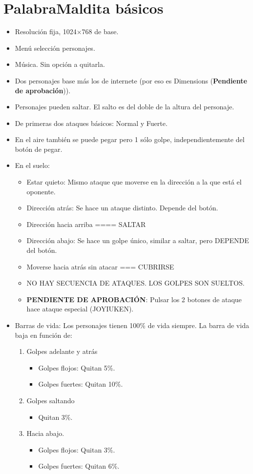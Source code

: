 \documentclass[10pt,a4paper,titlepage]{article}
\begin{document}
\section{PalabraMaldita básicos}
\begin{itemize}
	\item Resolución fija, 1024×768 de base.
	\item Menú selección personajes.
	\item Música. Sin opción a quitarla.
	\item Dos personajes base más los de internete (por eso es Dimensions (\textbf{Pendiente de aprobación})).
	\item Personajes pueden saltar. El salto es del doble de la altura del personaje.
	\item De primeras dos ataques básicos: Normal y Fuerte.
	\item En el aire también se puede pegar pero 1 sólo golpe, independientemente del botón de pegar.
	\item En el suelo:
	\begin{itemize}
		\item Estar quieto: Mismo ataque que moverse en la dirección a la que está el oponente.
		\item Dirección atrás: Se hace un ataque distinto. Depende del botón.
		\item Dirección hacia arriba ==== SALTAR
		\item Dirección abajo: Se hace un golpe único, similar a saltar, pero DEPENDE del botón.
		\item Moverse hacia atrás sin atacar === CUBRIRSE
		\item NO HAY SECUENCIA DE ATAQUES. LOS GOLPES SON SUELTOS.
		\item \textbf{PENDIENTE DE APROBACIÓN}: Pulsar los 2 botones de ataque hace ataque especial (JOYIUKEN).
	\end{itemize}

	\item Barras de vida: Los personajes tienen 100\% de vida siempre. La barra de vida baja en función de:
	\begin{enumerate}
		\item Golpes adelante y atrás
		\begin{itemize}
			\item Golpes flojos: Quitan 5\%. 
			\item Golpes fuertes: Quitan 10\%.
		\end{itemize}
		\item Golpes saltando
		\begin{itemize}
			\item Quitan 3\%.
		\end{itemize} 
		\item Hacia abajo.
		\begin{itemize}
			\item Golpes flojos: Quitan 3\%. 
			\item Golpes fuertes: Quitan 6\%.
		\end{itemize}
	\end{enumerate}


\end{itemize}
\end{document}
